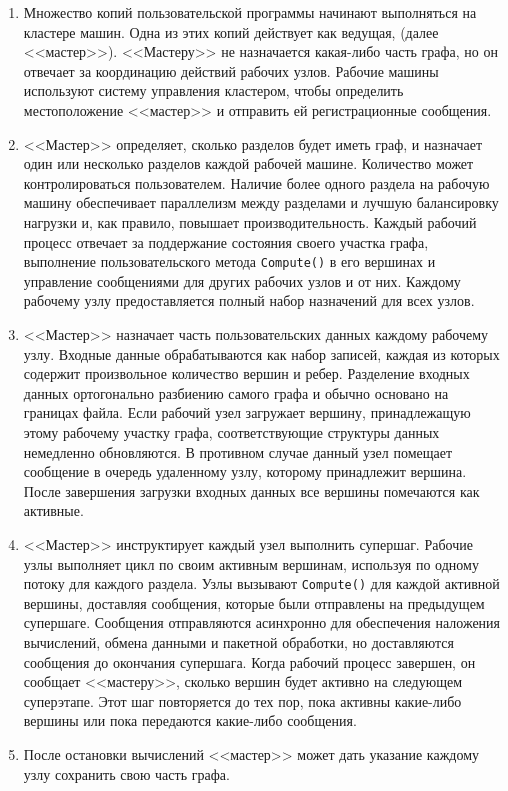 \begin{enumerate}
  \item Множество копий пользовательской программы начинают выполняться на кластере машин. 
    Одна из этих копий действует как ведущая, (далее <<мастер>>). 
    <<Мастеру>> не назначается какая-либо часть графа, но он отвечает за координацию действий рабочих узлов.
    Рабочие машины используют систему управления кластером, чтобы определить местоположение <<мастер>> и отправить ей регистрационные сообщения.
  \item <<Мастер>> определяет, сколько разделов будет иметь граф, и назначает один или несколько разделов каждой рабочей машине. 
    Количество может контролироваться пользователем. 
    Наличие более одного раздела на рабочую машину обеспечивает параллелизм между разделами и лучшую балансировку нагрузки и, как правило, повышает производительность. 
    Каждый рабочий процесс отвечает за поддержание состояния своего участка графа, выполнение пользовательского метода \texttt{Compute()} в его вершинах и управление сообщениями для других рабочих узлов и от них. 
    Каждому рабочему узлу предоставляется полный набор назначений для всех узлов.
  \item <<Мастер>> назначает часть пользовательских данных каждому рабочему узлу. 
    Входные данные обрабатываются как набор записей, каждая из которых содержит произвольное количество вершин и ребер. 
    Разделение входных данных ортогонально разбиению самого графа и обычно основано на границах файла. 
    Если рабочий узел загружает вершину, принадлежащую этому рабочему участку графа, соответствующие структуры данных немедленно обновляются. 
    В противном случае данный узел помещает сообщение в очередь удаленному узлу, которому принадлежит вершина. 
    После завершения загрузки входных данных все вершины помечаются как активные.
  \item <<Мастер>> инструктирует каждый узел выполнить супершаг. 
    Рабочие узлы выполняет цикл по своим активным вершинам, используя по одному потоку для каждого раздела. 
    Узлы вызывают \texttt{Compute()} для каждой активной вершины, доставляя сообщения, которые были отправлены на предыдущем супершаге. 
    Сообщения отправляются асинхронно для обеспечения наложения вычислений, обмена данными и пакетной обработки, но доставляются сообщения до окончания супершага.
    Когда рабочий процесс завершен, он сообщает <<мастеру>>, сколько вершин будет активно на следующем суперэтапе. 
    Этот шаг повторяется до тех пор, пока активны какие-либо вершины или пока передаются какие-либо сообщения.
  \item После остановки вычислений <<мастер>> может дать указание каждому узлу сохранить свою часть графа.
\end{enumerate}

